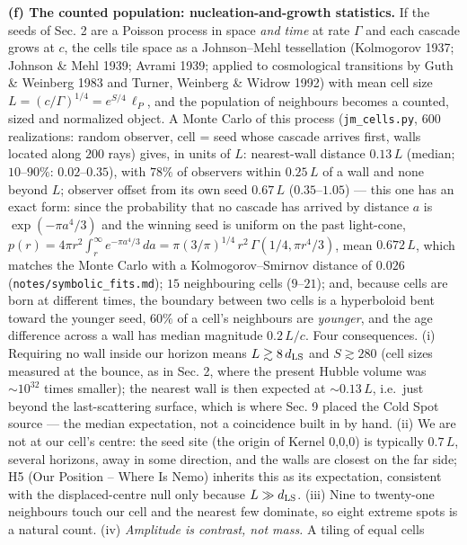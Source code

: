 \documentclass[
  11pt,
]{article}
\begin{document}
\textbf{(f) The counted population: nucleation-and-growth statistics.}
If the seeds of Sec. 2 are a Poisson process in space \emph{and time} at
rate \(\Gamma\) and each cascade grows at \(c\), the cells tile space as
a Johnson--Mehl tessellation (Kolmogorov 1937; Johnson \& Mehl 1939;
Avrami 1939; applied to cosmological transitions by Guth \& Weinberg
1983 and Turner, Weinberg \& Widrow 1992) with mean cell size
\(L = (c/\Gamma)^{1/4} = e^{S/4}\,\ell_P\), and the population of
neighbours becomes a counted, sized and normalized object. A Monte Carlo
of this process (\texttt{jm\_cells.py}, \(600\) realizations: random
observer, cell = seed whose cascade arrives first, walls located along
\(200\) rays) gives, in units of \(L\): nearest-wall distance
\(0.13\,L\) (median; \(10\)--\(90\%\): \(0.02\)--\(0.35\)), with
\(78\%\) of observers within \(0.25\,L\) of a wall and none beyond
\(L\); observer offset from its own seed \(0.67\,L\)
(\(0.35\)--\(1.05\)) --- this one has an exact form: since the
probability that no cascade has arrived by distance \(a\) is
\(\exp(-\pi a^4/3)\) and the winning seed is uniform on the past
light-cone,
\(p(r) = 4\pi r^2 \int_r^\infty e^{-\pi a^4/3}\,da = \pi(3/\pi)^{1/4}\, r^2\,\Gamma(1/4, \pi r^4/3)\),
mean \(0.672\,L\), which matches the Monte Carlo with a
Kolmogorov--Smirnov distance of \(0.026\)
(\texttt{notes/symbolic\_fits.md}); \(15\) neighbouring cells
(\(9\)--\(21\)); and, because cells are born at different times, the
boundary between two cells is a hyperboloid bent toward the younger
seed, \(60\%\) of a cell's neighbours are \emph{younger}, and the age
difference across a wall has median magnitude \(0.2\,L/c\). Four
consequences. (i) Requiring no wall inside our horizon means
\(L \gtrsim 8\,d_{\rm LS}\) and \(S \gtrsim 280\) (cell sizes measured
at the bounce, as in Sec. 2, where the present Hubble volume was
\(\sim 10^{32}\) times smaller); the nearest wall is then expected at
\(\sim 0.13\,L\), i.e.~just beyond the last-scattering surface, which is
where Sec. 9 placed the Cold Spot source --- the median expectation, not
a coincidence built in by hand. (ii) We are not at our cell's centre:
the seed site (the origin of Kernel 0,0,0) is typically \(0.7\,L\),
several horizons, away in some direction, and the walls are closest on
the far side; H5 (Our Position -- Where Is Nemo) inherits this as its
expectation, consistent with the displaced-centre null only because
\(L \gg d_{\rm LS}\). (iii) Nine to twenty-one neighbours touch our cell
and the nearest few dominate, so eight extreme spots is a natural count.
(iv) \emph{Amplitude is contrast, not mass.} A tiling of equal cells
\end{document}
